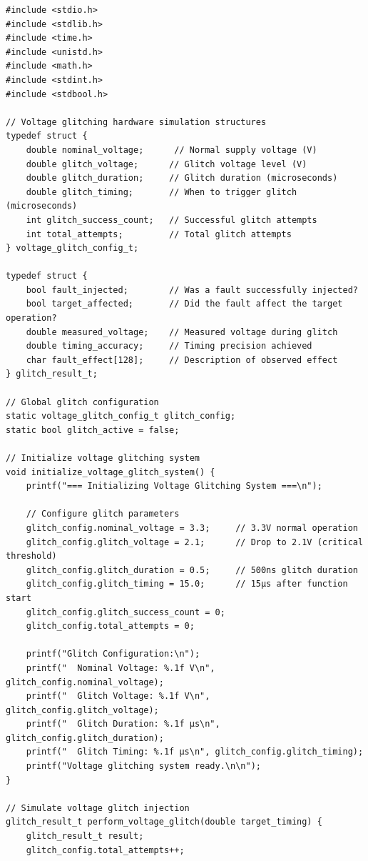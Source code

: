 \documentclass[12pt,a4paper]{article}
\begin{document}
\begin{lstlisting}[caption={Complete Voltage Glitching Attack System}]
#include <stdio.h>
#include <stdlib.h>
#include <time.h>
#include <unistd.h>
#include <math.h>
#include <stdint.h>
#include <stdbool.h>

// Voltage glitching hardware simulation structures
typedef struct {
    double nominal_voltage;      // Normal supply voltage (V)
    double glitch_voltage;      // Glitch voltage level (V)
    double glitch_duration;     // Glitch duration (microseconds)
    double glitch_timing;       // When to trigger glitch (microseconds)
    int glitch_success_count;   // Successful glitch attempts
    int total_attempts;         // Total glitch attempts
} voltage_glitch_config_t;

typedef struct {
    bool fault_injected;        // Was a fault successfully injected?
    bool target_affected;       // Did the fault affect the target operation?
    double measured_voltage;    // Measured voltage during glitch
    double timing_accuracy;     // Timing precision achieved
    char fault_effect[128];     // Description of observed effect
} glitch_result_t;

// Global glitch configuration
static voltage_glitch_config_t glitch_config;
static bool glitch_active = false;

// Initialize voltage glitching system
void initialize_voltage_glitch_system() {
    printf("=== Initializing Voltage Glitching System ===\n");
    
    // Configure glitch parameters
    glitch_config.nominal_voltage = 3.3;     // 3.3V normal operation
    glitch_config.glitch_voltage = 2.1;      // Drop to 2.1V (critical threshold)
    glitch_config.glitch_duration = 0.5;     // 500ns glitch duration
    glitch_config.glitch_timing = 15.0;      // 15μs after function start
    glitch_config.glitch_success_count = 0;
    glitch_config.total_attempts = 0;
    
    printf("Glitch Configuration:\n");
    printf("  Nominal Voltage: %.1f V\n", glitch_config.nominal_voltage);
    printf("  Glitch Voltage: %.1f V\n", glitch_config.glitch_voltage);
    printf("  Glitch Duration: %.1f μs\n", glitch_config.glitch_duration);
    printf("  Glitch Timing: %.1f μs\n", glitch_config.glitch_timing);
    printf("Voltage glitching system ready.\n\n");
}

// Simulate voltage glitch injection
glitch_result_t perform_voltage_glitch(double target_timing) {
    glitch_result_t result;
    glitch_config.total_attempts++;
    

\end{lstlisting}
\end{document}
